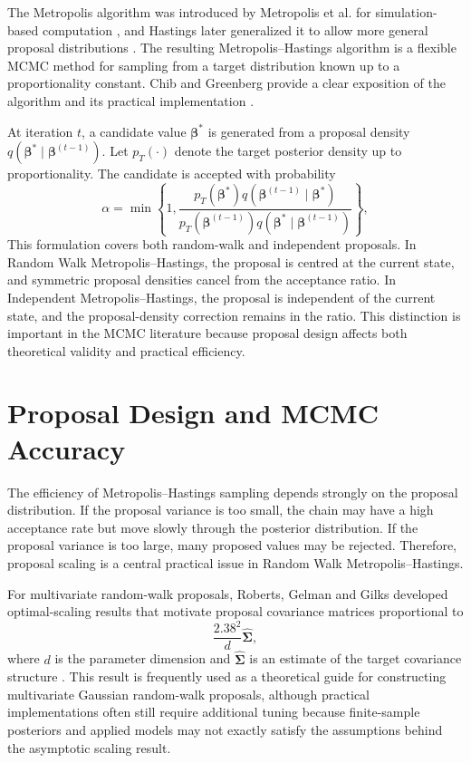 The Metropolis algorithm was introduced by Metropolis et al. for simulation-based computation \cite{metropolis1953equation}, and Hastings later generalized it to allow more general proposal distributions \cite{hastings1970monte}. The resulting Metropolis--Hastings algorithm is a flexible MCMC method for sampling from a target distribution known up to a proportionality constant. Chib and Greenberg provide a clear exposition of the algorithm and its practical implementation \cite{chib1995understanding}.

At iteration $t$, a candidate value $\boldsymbol{\beta}^{*}$ is generated from a proposal density $q(\boldsymbol{\beta}^{*}\mid\boldsymbol{\beta}^{(t-1)})$. Let $p_T(\cdot)$ denote the target posterior density up to proportionality. The candidate is accepted with probability
\[
\alpha
=
\min\left\{
1,
\frac{
  p_T(\boldsymbol{\beta}^{*})
q(\boldsymbol{\beta}^{(t-1)}\mid\boldsymbol{\beta}^{*})
}{
  p_T(\boldsymbol{\beta}^{(t-1)})
q(\boldsymbol{\beta}^{*}\mid\boldsymbol{\beta}^{(t-1)})
}
\right\},
\]
This formulation covers both random-walk and independent proposals. In Random Walk Metropolis--Hastings, the proposal is centred at the current state, and symmetric proposal densities cancel from the acceptance ratio. In Independent Metropolis--Hastings, the proposal is independent of the current state, and the proposal-density correction remains in the ratio. This distinction is important in the MCMC literature because proposal design affects both theoretical validity and practical efficiency.

\section{Proposal Design and MCMC Accuracy}

The efficiency of Metropolis--Hastings sampling depends strongly on the proposal distribution. If the proposal variance is too small, the chain may have a high acceptance rate but move slowly through the posterior distribution. If the proposal variance is too large, many proposed values may be rejected. Therefore, proposal scaling is a central practical issue in Random Walk Metropolis--Hastings.

For multivariate random-walk proposals, Roberts, Gelman and Gilks developed optimal-scaling results that motivate proposal covariance matrices proportional to
\[
\frac{2.38^2}{d}\widehat{\boldsymbol{\Sigma}},
\]
where $d$ is the parameter dimension and $\widehat{\boldsymbol{\Sigma}}$ is an estimate of the target covariance structure \cite{roberts1997weak}. This result is frequently used as a theoretical guide for constructing multivariate Gaussian random-walk proposals, although practical implementations often still require additional tuning because finite-sample posteriors and applied models may not exactly satisfy the assumptions behind the asymptotic scaling result.

